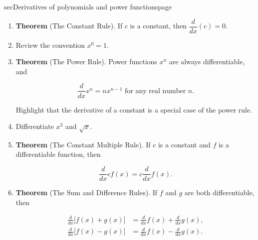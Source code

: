 \documentclass[../main]{subfiles}
\begin{document}
%
%
%


\begin{outline}{sec}{Derivatives of polynomials and power functions}{page} 
  \label{act:polynomials}
  \begin{enumerate}
    \item \textbf{Theorem} (The Constant Rule). If \(c\) is a constant, then \(\dfrac{d}{dx}(c) = 0\).
    \item Review the convention \(x^{0} = 1\).
    \item \textbf{Theorem} (The Power Rule). Power functions \(x^{n}\) are always differentiable, and
      \begin{mdframed}[style=simple]
        \[
          \frac{d}{dx} x^{n} = n x^{n-1} \text{ for any real number } n.
        \]
      \end{mdframed}
        

      Highlight that the derivative of a constant is a special case of the power rule.
      
    \item Differentiate \(x^{3}\) and \(\sqrt{x}\).


    \item \textbf{Theorem} (The Constant Multiple Rule). If \(c\) is a constant and \(f\) is a differentiable function, then
      \begin{mdframed}[style=simple]
        \[
          \frac{d}{dx} c f(x) = c \dfrac{d}{dx} f(x).
        \]
      \end{mdframed}
        

    \item \textbf{Theorem} (The Sum and Difference Rules). If \(f\) and \(g\) are both differentiable, then
      \begin{mdframed}[style=simple]
        \begin{align*}
          \frac{d}{dx} \Big[f(x) + g(x) \Big] &= \frac{d}{dx} f(x) + \frac{d}{dx} g(x), \\
          \frac{d}{dx} \Big[f(x) - g(x) \Big] &= \frac{d}{dx} f(x) - \frac{d}{dx} g(x).
        \end{align*}
      \end{mdframed}
        


\end{enumerate}
\end{outline}
\end{document}
